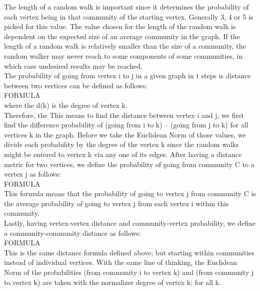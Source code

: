 \documentclass[10pt]{article}
\begin{document}
The length of a random walk is important since it determines the probability of each vertex being in that community of the starting vertex. Generally 3, 4 or 5 is picked for this value. The value chosen for the length of the random walk is dependent on the expected size of an average community in the graph. If the length of a random walk is relatively smaller than the size of a community, the random walker may never reach to some components of some communities, in which case undesired results may be reached. \\

The probability of going from vertex i to j in a given graph in t steps is distance between two vertices can be defined as follows: \\

FORMULA \\

where the d(k) is the degree of vertex k. \\

Therefore, the
  This means to find the distance between vertex i and j, we first find the difference probability of (going from i to k) – (going from j to k) for all vertices k in the graph. Before we take the Euclidean Norm of those values, we divide each probability by the degree of the vertex k since the random walks might be entered to vertex k via any one of its edges.
After having a distance metric for two vertices, we define the probability of going from community C to a vertex j as follows: \\

FORMULA \\

This formula means that the probability of going to vertex j from community C is the average probability of going to vertex j from each vertex i within this community. \\

Lastly, having vertex-vertex distance and community-vertex probability, we define a community-community distance as follows: \\

FORMULA \\

This is the same distance formula defined above; but starting within communities instead of individual vertices. With the same line of thinking, the Euclidean Norm of the probabilities (from community i to vertex k) and (from community j to vertex k) are taken with the normalizer degree of vertex k; for all k. \\
\end{document}
